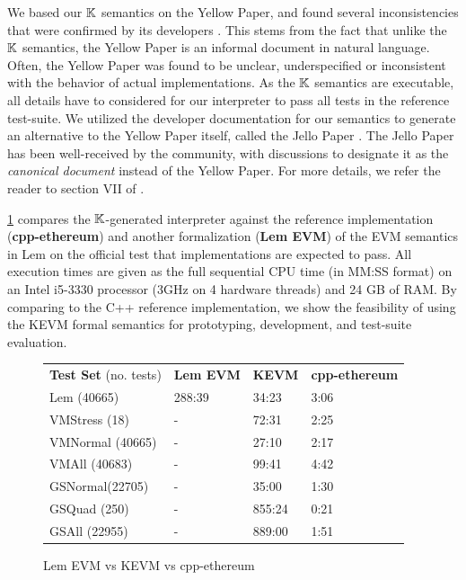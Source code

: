 We based our $\mathbb{K}$ semantics on the Yellow Paper, and
found several inconsistencies that were confirmed by its developers \cite{HildenbrandtCSF18}.
This stems from the fact that unlike the $\mathbb{K}$ semantics,
the Yellow Paper is an informal document in natural language.
Often, the Yellow Paper was found to be unclear, underspecified
or inconsistent with the behavior of actual implementations.
As the $\mathbb{K}$ semantics are executable, all details have to
considered for our interpreter to pass all tests in the reference
test-suite. We utilized the developer documentation for our semantics
to generate an alternative to the Yellow Paper itself, called the Jello Paper
\cite{evmJellopaperUrl}. The Jello Paper has been well-received by the
community, with discussions to designate it as the \emph{canonical document}
instead of the Yellow Paper. For more details, we refer the reader to
section VII of \cite{HildenbrandtCSF18}.


\figurename{} \ref{fig:evm-comparison} compares the $\mathbb{K}{}$-generated interpreter
against the reference implementation (\textbf{cpp-ethereum}) and
another formalization (\textbf{Lem EVM}) of the EVM semantics \cite{HiraiWSTC17} in Lem \cite{MulliganACM14}
on the official test that implementations are expected to pass.
All execution times are given as the full sequential CPU time (in MM:SS format) on an Intel i5-3330 processor (3GHz on 4 hardware threads) and 24 GB of RAM.
By comparing to the C++ reference implementation, we show the feasibility of using the KEVM formal semantics for prototyping, development, and test-suite evaluation.

\begin{figure}
      \begin{tabular}{ l l l l }
          \textbf{Test Set} (no. tests) & \textbf{Lem EVM} & \textbf{KEVM} & \textbf{cpp-ethereum} \\
          Lem (40665)                   & 288:39           & 34:23         & 3:06                  \\
          VMStress (18)                 & -                & 72:31         & 2:25                  \\
          VMNormal (40665)              & -                & 27:10         & 2:17                  \\
          VMAll (40683)                 & -                & 99:41         & 4:42                  \\
          GSNormal(22705)               & -                & 35:00         & 1:30                  \\
          GSQuad (250)                  & -                & 855:24        & 0:21                  \\
          GSAll (22955)                 & -                & 889:00        & 1:51                  \\
      \end{tabular}
  \caption{Lem EVM vs KEVM vs cpp-ethereum}\label{fig:evm-comparison}
\end{figure}

